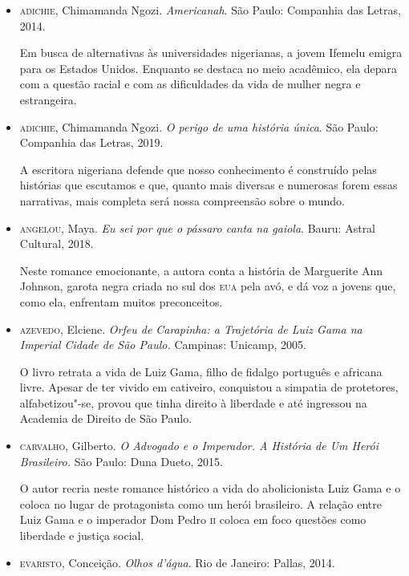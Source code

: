 \documentclass[12pt]{extarticle}
\begin{document}
\begin{itemize}

\item\textsc{adichie}, Chimamanda Ngozi. \textit{Americanah}. São Paulo: Companhia das Letras, 2014.

Em busca de alternativas às universidades nigerianas, a jovem Ifemelu
emigra para os Estados Unidos. Enquanto se destaca no meio acadêmico,
ela depara com a questão racial e com as dificuldades da vida de mulher
negra e estrangeira.

\item\textsc{adichie}, Chimamanda Ngozi. \textit{O perigo de uma história única}. São Paulo: Companhia das Letras, 2019.

A escritora nigeriana defende que nosso conhecimento é construído pelas
histórias que escutamos e que, quanto mais diversas e numerosas forem
essas narrativas, mais completa será nossa compreensão sobre o mundo.

\item\textsc{angelou}, Maya. \textit{Eu sei por que o pássaro canta na gaiola}.
  Bauru: Astral Cultural, 2018.

Neste romance emocionante, a autora conta a história de Marguerite Ann
Johnson, garota negra criada no sul dos \textsc{eua} pela avó, e dá voz a jovens
que, como ela, enfrentam muitos preconceitos.


\item\textsc{azevedo}, Elciene. \textit{Orfeu de Carapinha: a Trajetória de Luiz Gama na Imperial Cidade de São Paulo.} Campinas: Unicamp, 2005.

O livro retrata a vida de Luiz Gama, filho de fidalgo português e
africana livre. Apesar de ter vivido em cativeiro, conquistou a simpatia
de protetores, alfabetizou"-se, provou que tinha direito à liberdade e
até ingressou na Academia de Direito de São Paulo.

\item\textsc{carvalho}, Gilberto. \textit{O Advogado e o Imperador. A História de Um
Herói Brasileiro.} São Paulo: Duna Dueto, 2015.

O autor recria neste romance histórico a vida do abolicionista Luiz Gama
e o coloca no lugar de protagonista como um herói brasileiro. A relação
entre Luiz Gama e o imperador Dom Pedro \textsc{ii} coloca em foco questões como
liberdade e justiça social.

\item\textsc{evaristo}, Conceição. \textit{Olhos d'água}. Rio de Janeiro: Pallas, 2014.


\end{itemize}
\end{document}

